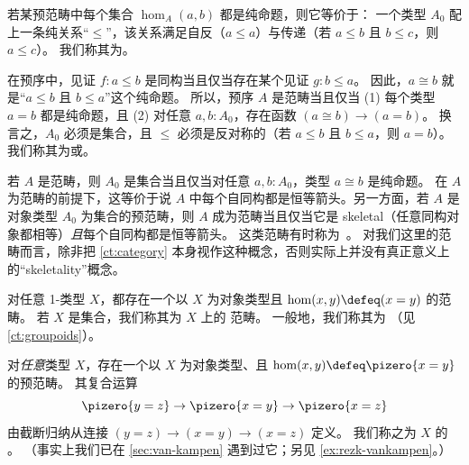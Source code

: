 \begin{eg}\label{ct:orders}
  若某预范畴中每个集合 $\hom_A(a,b)$ 都是纯命题，则它等价于：
  一个类型 $A_0$ 配上一条纯关系“$\le$”，该关系满足自反（$a\le a$）与传递（若 $a\le b$ 且 $b\le c$，则 $a\le c$）。
  我们称其为。

  在预序中，见证 $f: a\le b$ 是同构当且仅当存在某个见证 $g: b\le a$。
  因此，$a\cong b$ 就是“$a\le b$ 且 $b\le a$”这个纯命题。
  所以，预序 $A$ 是范畴当且仅当 (1) 每个类型 $a=b$ 都是纯命题，且 (2) 对任意 $a,b:A_0$，存在函数 $(a\cong b) \to (a=b)$。
  换言之，$A_0$ 必须是集合，且 $\le$ 必须是反对称的（若 $a\le b$ 且 $b\le a$，则 $a=b$）。
  我们称其为或。
\end{eg}

\begin{eg}\label{ct:gaunt}
  若 $A$ 是范畴，则 $A_0$ 是集合当且仅当对任意 $a,b:A_0$，类型 $a\cong b$ 是纯命题。
  在 $A$ 为范畴的前提下，这等价于说 $A$ 中每个自同构都是恒等箭头。另一方面，若 $A$ 是对象类型 $A_0$ 为集合的预范畴，则 $A$ 成为范畴当且仅当它是 skeletal（任意同构对象都相等）\emph{且}每个自同构都是恒等箭头。
  这类范畴有时称为~\cite{bsp12infncats}。
  对我们这里的范畴而言，除非把 \cref{ct:category} 本身视作这种概念，否则实际上并没有真正意义上的“skeletality”概念。
\end{eg}

\begin{eg}\label{ct:discrete}
  对任意 1-类型 $X$，都存在一个以 $X$ 为对象类型且 $\hom(x,y) \defeq (x=y)$ 的范畴。
  若 $X$ 是集合，我们称其为 $X$ 上的
  范畴。
  一般地，我们称其为
  （见 \cref{ct:groupoids}）。
\end{eg}

\begin{eg}\label{ct:fundgpd}
  对\emph{任意}类型 $X$，存在一个以 $X$ 为对象类型、且 $\hom(x,y) \defeq \pizero{x=y}$ 的预范畴。
  其复合运算
  \[ \pizero{y=z} \to \pizero{x=y} \to \pizero{x=z} \]
  由截断归纳从连接 $(y=z)\to(x=y)\to(x=z)$ 定义。
  我们称之为 $X$ 的
  。
  （事实上我们已在 \cref{sec:van-kampen} 遇到过它；另见 \cref{ex:rezk-vankampen}。）
\end{eg}

